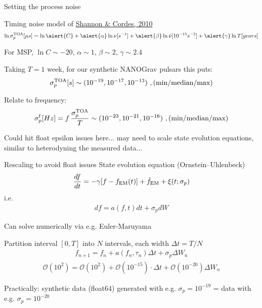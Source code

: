 \documentclass[10pt]{beamer}
\begin{document}
\begin{frame}{Setting the process noise}
	
	
Timing noise model of \href{https://arxiv.org/abs/1010.4794}{Shannon \& Cordes, 2010}
\begin{eqnarray}
 \ln \sigma_p^{\rm TOA} [\mu s] = \ln \alert{C} + \alert{\alpha} \ln \nu [s^{-1}] + \alert{\beta} \ln \dot{\nu} [10^{-15} s^{-2}] + \alert{\gamma} \ln T [years]
\end{eqnarray}

For MSP, $\ln C \sim -20$, $\alpha \sim 1$, $\beta\sim2$, $\gamma \sim 2.4$

Taking $T = 1$ week, for our synthetic NANOGrav pulsars this puts:	 $$\sigma_p^{\rm TOA}  [s] \sim (10^{-19}, 10^{-17}, 10^{-13}) \, \, , \text{(min/median/max)}$$ 

Relate to frequency:
$$ \sigma_p^{\rm f} [Hz] = f \, \frac{\sigma_p^{\rm TOA}}{T}  \sim (10^{-23}, 10^{-21}, 10^{-16}) \, \, , \text{(min/median/max)}$$

Could hit float epsilon issues here... may need to scale state evolution equations, similar to heterodyning the measured data...

\end{frame}




\begin{frame}{Rescaling to avoid float issues}
	State evolution equation (Ornstein–Uhlenbeck)
	\begin{eqnarray}
		\frac{df}{dt}= -\gamma [f - f_{\rm EM}(t)] + \dot{f}_{\rm EM} + \xi(t; \sigma_p)
	\end{eqnarray}
i.e. 
		\begin{eqnarray}
		df = a(f,t) dt + \sigma_p dW
	\end{eqnarray}

Can solve numerically via e.g. Euler-Maruyama

Partition interval $[0,T]$ into $N$ intervals, each width $\Delta t = T/N$ 
\begin{eqnarray}
	f_{n+1} = f_{n} + a(f_n, \tau_n) \Delta t + \sigma_p \Delta W_n
\end{eqnarray}
\begin{eqnarray}
		\mathcal{O}(10^2) = \mathcal{O}(10^2) + \mathcal{O}(10^{-15}) \cdot \Delta t  + \mathcal{O}(10^{-20}) \Delta W_n
\end{eqnarray}

Practically: synthetic data (float64) generated with e.g. $\sigma_p = 10^{-19}$ = data with e.g. $\sigma_p = 10^{-20}$ 

	
\end{frame}
\end{document}
